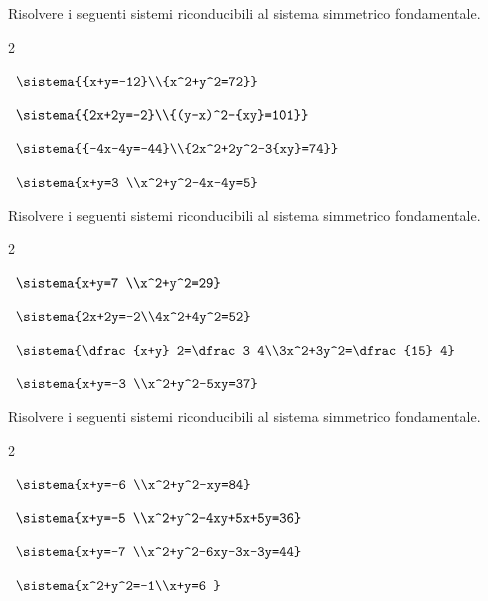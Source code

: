 \begin{esercizio}[*]
\label{ese:6.21}
Risolvere i seguenti sistemi riconducibili al sistema simmetrico 
fondamentale.
\begin{htmulticols}{2}
\begin{enumeratea}

\item~\(\sistema{{x+y=-12}\\{x^2+y^2=72}}\)

\item~\(\sistema{{2x+2y=-2}\\{(y-x)^2-{xy}=101}}\)



\item~\(\sistema{{-4x-4y=-44}\\{2x^2+2y^2-3{xy}=74}}\)
\item~\(\sistema{x+y=3 
\\x^2+y^2-4x-4y=5}\)
\end{enumeratea}
\end{htmulticols}
\end{esercizio}

\begin{esercizio}[*]
\label{ese:6.22}
Risolvere i seguenti sistemi riconducibili al sistema simmetrico 
fondamentale.
\begin{htmulticols}{2}
\begin{enumeratea}
\item~\(\sistema{x+y=7 \\x^2+y^2=29}\)
\item~\(\sistema{2x+2y=-2\\4x^2+4y^2=52}\)
\item~\(\sistema{\dfrac{x+y} 2=\dfrac 3 
4\\3x^2+3y^2=\dfrac{15} 
4}\)
\item~\(\sistema{x+y=-3 
\\x^2+y^2-5xy=37}\)
\end{enumeratea}
\end{htmulticols}
\end{esercizio}

\begin{esercizio}[*]
\label{ese:6.23}
Risolvere i seguenti sistemi riconducibili al sistema simmetrico 
fondamentale.
\begin{htmulticols}{2}
\begin{enumeratea}
\item~\(\sistema{x+y=-6 \\x^2+y^2-xy=84}\)
\item~\(\sistema{x+y=-5 
\\x^2+y^2-4xy+5x+5y=36}\)
\item~\(\sistema{x+y=-7 
\\x^2+y^2-6xy-3x-3y=44}\)
\item~\(\sistema{x^2+y^2=-1\\x+y=6 }\)
\end{enumeratea}
\end{htmulticols}
\end{esercizio}

